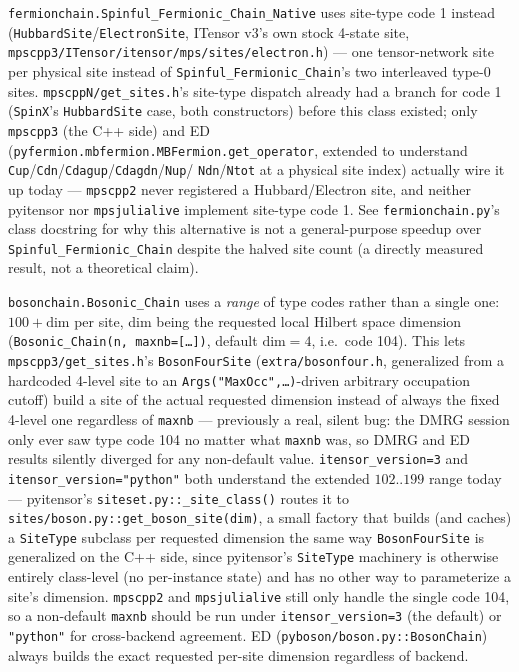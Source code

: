 \documentclass[11pt]{article}
\begin{document}
\texttt{fermionchain.Spinful\_Fermionic\_Chain\_Native} uses site-type
code 1 instead (\texttt{HubbardSite}/\texttt{ElectronSite}, ITensor
v3's own stock 4-state site,
\texttt{mpscpp3/ITensor/itensor/mps/sites/electron.h}) --- one
tensor-network site per physical site instead of
\texttt{Spinful\_Fermionic\_Chain}'s two interleaved type-0 sites.
\texttt{mpscppN/get\_sites.h}'s site-type dispatch already had a branch
for code 1 (\texttt{SpinX}'s \texttt{HubbardSite} case, both
constructors) before this class existed; only \texttt{mpscpp3} (the C++
side) and ED (\texttt{pyfermion.mbfermion.MBFermion.get\_operator},
extended to understand
\texttt{Cup}/\texttt{Cdn}/\texttt{Cdagup}/\texttt{Cdagdn}/\texttt{Nup}/
\texttt{Ndn}/\texttt{Ntot} at a physical site index) actually wire it up
today --- \texttt{mpscpp2} never registered a Hubbard/Electron site, and
neither pyitensor nor \texttt{mpsjulialive} implement site-type code 1.
See \texttt{fermionchain.py}'s class docstring for why this alternative
is not a general-purpose speedup over \texttt{Spinful\_Fermionic\_Chain}
despite the halved site count (a directly measured result, not a
theoretical claim).

\texttt{bosonchain.Bosonic\_Chain} uses a \emph{range} of type codes
rather than a single one: $100+\text{dim}$ per site, dim being the
requested local Hilbert space dimension
(\texttt{Bosonic\_Chain(n, maxnb=[\ldots])}, default $\text{dim}=4$,
i.e.\ code 104). This lets \texttt{mpscpp3/get\_sites.h}'s
\texttt{BosonFourSite} (\texttt{extra/bosonfour.h}, generalized from a
hardcoded 4-level site to an \texttt{Args("MaxOcc",\ldots)}-driven
arbitrary occupation cutoff) build a site of the actual requested
dimension instead of always the fixed 4-level one regardless of
\texttt{maxnb} --- previously a real, silent bug: the DMRG session only
ever saw type code 104 no matter what \texttt{maxnb} was, so DMRG and ED
results silently diverged for any non-default value.
\texttt{itensor\_version=3} and \texttt{itensor\_version="python"} both
understand the extended $102..199$ range today --- pyitensor's
\texttt{siteset.py::\_site\_class()} routes it to
\texttt{sites/boson.py::get\_boson\_site(dim)}, a small factory that
builds (and caches) a \texttt{SiteType} subclass per requested dimension
the same way \texttt{BosonFourSite} is generalized on the C++ side,
since pyitensor's \texttt{SiteType} machinery is otherwise entirely
class-level (no per-instance state) and has no other way to
parameterize a site's dimension. \texttt{mpscpp2} and
\texttt{mpsjulialive} still only handle the single code 104, so a
non-default \texttt{maxnb} should be run under
\texttt{itensor\_version=3} (the default) or \texttt{"python"} for
cross-backend agreement. ED (\texttt{pyboson/boson.py::BosonChain})
always builds the exact requested per-site dimension regardless of
backend.
\end{document}
